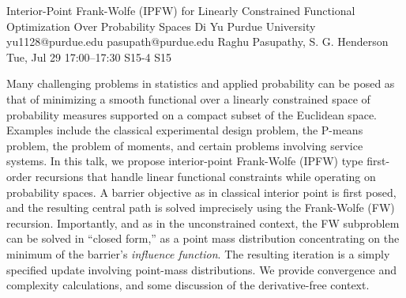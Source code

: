 \begin{talk}
  {Interior-Point Frank-Wolfe (IPFW) for Linearly Constrained Functional Optimization Over Probability Spaces}%
  {Di Yu}%
  {Purdue University}%
  {yu1128@purdue.edu}%
  {pasupath@purdue.edu}%
  {Raghu Pasupathy, S. G. Henderson}%
  {Tue, Jul 29 17:00--17:30}%
  {S15-4}%
  {S15}%
  
    
   
Many challenging problems in statistics and applied probability can be posed as that of minimizing a smooth functional over a linearly constrained space of probability measures supported on a compact subset of the Euclidean space. Examples include the classical experimental design problem, the P-means problem, the problem of moments, and certain problems involving service systems.  In this talk, we propose interior-point Frank-Wolfe (IPFW) type first-order recursions that handle linear functional constraints while operating on probability spaces. A barrier objective as in classical interior point is first posed, and the resulting central path is solved imprecisely using the Frank-Wolfe (FW) recursion. Importantly, and as in the unconstrained context, the FW subproblem can be solved in ``closed form,'' as a point mass distribution concentrating on the minimum of the barrier's \emph{influence function}. The resulting iteration is a simply specified update involving point-mass distributions. We provide convergence and complexity calculations, and some discussion of the derivative-free context. 

\medskip




\end{talk}

